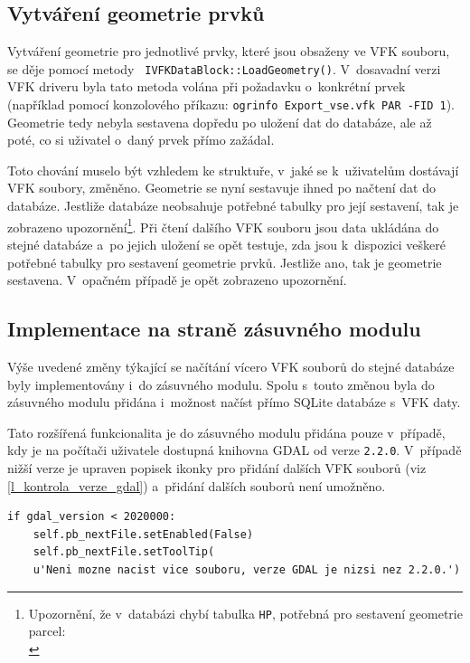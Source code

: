 \documentclass[a4paper,12pt,oneside]{book}
\begin{document}
\subsection{Vytváření geometrie prvků}
Vytváření geometrie pro jednotlivé prvky, které jsou obsaženy ve VFK
souboru, se děje pomocí metody \texttt{
  IVFKDataBlock::LoadGeometry()}. V~dosavadní verzi VFK driveru byla
tato metoda volána při požadavku o~konkrétní prvek (například pomocí
konzolového příkazu: \texttt{ogrinfo Export\_vse.vfk PAR -FID
  1}). Geometrie tedy nebyla sestavena dopředu po uložení dat do
databáze, ale až poté, co si uživatel o~daný prvek přímo zažádal.

Toto chování muselo být vzhledem ke struktuře, v~jaké se k~uživatelům
dostávají VFK soubory, změněno. Geometrie se nyní sestavuje ihned po
načtení dat do databáze. Jestliže databáze neobsahuje potřebné tabulky
pro její sestavení, tak je zobrazeno upozornění\footnote{Upozornění,
  že v~databázi chybí tabulka \texttt{HP}, potřebná pro sestavení
  geometrie parcel:\\}. Při čtení dalšího VFK souboru jsou data
ukládána do stejné databáze a~po jejich uložení se opět testuje, zda
jsou k~dispozici veškeré potřebné tabulky pro sestavení geometrie
prvků. Jestliže ano, tak je geometrie sestavena. V~opačném případě je
opět zobrazeno upozornění.

\subsection{Implementace na straně zásuvného modulu}
Výše uvedené změny týkající se načítání vícero VFK souborů do stejné
databáze byly implementovány i~do zásuvného modulu. Spolu s~touto
změnou byla do zásuvného modulu přidána i~možnost načíst přímo SQLite
databáze s~VFK daty.

Tato rozšířená funkcionalita je do zásuvného modulu přidána pouze
v~případě, kdy je na počítači uživatele dostupná knihovna GDAL od
verze \texttt{2.2.0}. V~případě nižší verze je upraven popisek
ikonky pro přidání dalších VFK souborů (viz
\ref{l_kontrola_verze_gdal}) a~přidání dalších souborů není umožněno.

{\scriptsize
\begin{lstlisting}[style=python, 
		    caption={Kontrola verze GDAL na straně VFK pluginu}, 
		    label=l_kontrola_verze_gdal]
if gdal_version < 2020000:
    self.pb_nextFile.setEnabled(False)
    self.pb_nextFile.setToolTip(
	u'Neni mozne nacist vice souboru, verze GDAL je nizsi nez 2.2.0.')
\end{lstlisting}
}
\end{document}
